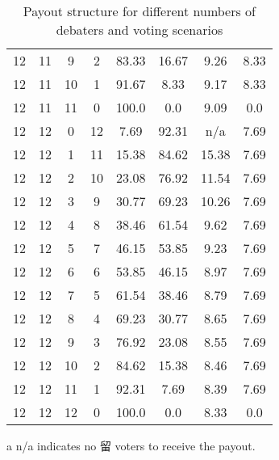 \begin{table}[H]
\begin{threeparttable}
\begin{tabular}{cccccccc}
12 & 11 & 9 & 2 & 83.33 & 16.67 & 9.26 & 8.33 \\
12 & 11 & 10 & 1 & 91.67 & 8.33 & 9.17 & 8.33 \\
12 & 11 & 11 & 0 & 100.0 & 0.0 & 9.09 & 0.0 \\
12 & 12 & 0 & 12 & 7.69 & 92.31 & n/a\tnote{a} & 7.69 \\
12 & 12 & 1 & 11 & 15.38 & 84.62 & 15.38 & 7.69 \\
12 & 12 & 2 & 10 & 23.08 & 76.92 & 11.54 & 7.69 \\
12 & 12 & 3 & 9 & 30.77 & 69.23 & 10.26 & 7.69 \\
12 & 12 & 4 & 8 & 38.46 & 61.54 & 9.62 & 7.69 \\
12 & 12 & 5 & 7 & 46.15 & 53.85 & 9.23 & 7.69 \\
12 & 12 & 6 & 6 & 53.85 & 46.15 & 8.97 & 7.69 \\
12 & 12 & 7 & 5 & 61.54 & 38.46 & 8.79 & 7.69 \\
12 & 12 & 8 & 4 & 69.23 & 30.77 & 8.65 & 7.69 \\
12 & 12 & 9 & 3 & 76.92 & 23.08 & 8.55 & 7.69 \\
12 & 12 & 10 & 2 & 84.62 & 15.38 & 8.46 & 7.69 \\
12 & 12 & 11 & 1 & 92.31 & 7.69 & 8.39 & 7.69 \\
12 & 12 & 12 & 0 & 100.0 & 0.0 & 8.33 & 0.0 \\

\bottomrule
\end{tabular}
\begin{tablenotes}
    \item[a] n/a indicates no 留 voters to receive the payout.
\end{tablenotes}
\caption{Payout structure for different numbers of debaters and voting scenarios}
\end{threeparttable}
\end{table}

